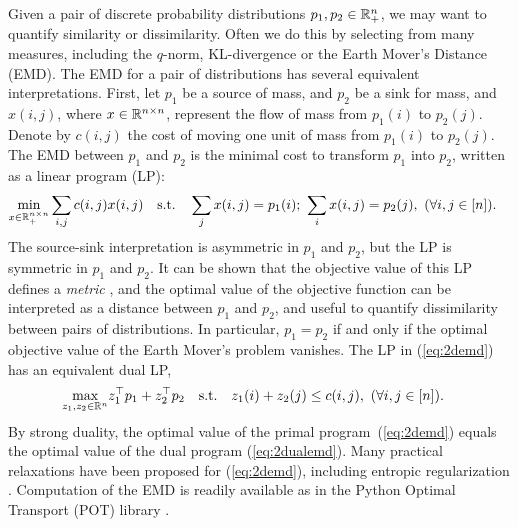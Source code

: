 Given a pair of discrete probability distributions $p_1,p_2\in\mathbb{R}^{n}_+$, we may want to quantify similarity or dissimilarity. 
Often we do this by selecting from many measures, including the $q$-norm, KL-divergence or the Earth Mover's Distance (EMD).
%
The EMD for a pair of distributions has several equivalent interpretations. First, let $p_1$ be a source of mass, and $p_2$ be a sink for mass, and  $x(i,j)$, where  $x\in\mathbb{R}^{n\times n}$, represent the flow of mass from $p_1(i)$ to $p_2(j)$.
Denote by $c(i,j)$ the cost of moving one unit of mass from  $p_1(i)$ to $p_2(j)$.
The EMD between $p_1$ and $p_2$ is the minimal cost to transform $p_1$ into $p_2$, 
written as a linear program (LP):
\begin{align}\label{eq:2demd}
\begin{aligned}
\underset{{x\in \RR^{n\times n}_+}}{\textrm{min}} \sum_{i,j} c(i,j) x(i,j) \quad  \textrm{s.t.}\quad \sum_j x(i,j) &= p_1(i); \ 
\sum_i x(i,j) = p_2(j),\ (\forall i,j\in[n]).
\end{aligned}
\end{align}
The source-sink interpretation is asymmetric in $p_1$ and $p_2$, but the LP is symmetric in $p_1$ and $p_2$.  It can be shown that the objective value of this LP defines a {\em metric} \citep{kantorovich1960mathematical}, and the optimal value of the objective function can be interpreted as a distance between $p_1$ and $p_2$,  %
and useful to quantify dissimilarity between pairs of distributions. In particular,  $p_1=p_2$ if and only if the optimal objective value of the Earth Mover's problem vanishes.
%
The LP in (\ref{eq:2demd}) has an equivalent dual LP, 
\begin{align}\label{eq:2dualemd}\begin{aligned}
    &\underset{z_1,z_2\in\mathbb{R}^{n}}{\textrm{max}} z_1^\top p_1 + z_2^\top p_2 \quad 
    \textrm{s.t.}\quad  z_1(i) + z_2(j)\leq c(i,j),\  (\forall i,j\in [n]).
    \end{aligned}
\end{align}
By strong duality, the optimal value of the primal program~(\ref{eq:2demd}) equals the optimal value of the dual program (\ref{eq:2dualemd}). 
Many practical relaxations have been proposed for (\ref{eq:2demd}), including entropic regularization \citep{cuturi2013sinkhorn}.
Computation of the EMD is readily available as in the Python Optimal Transport (POT) library \citep{flamary2021pot}.

